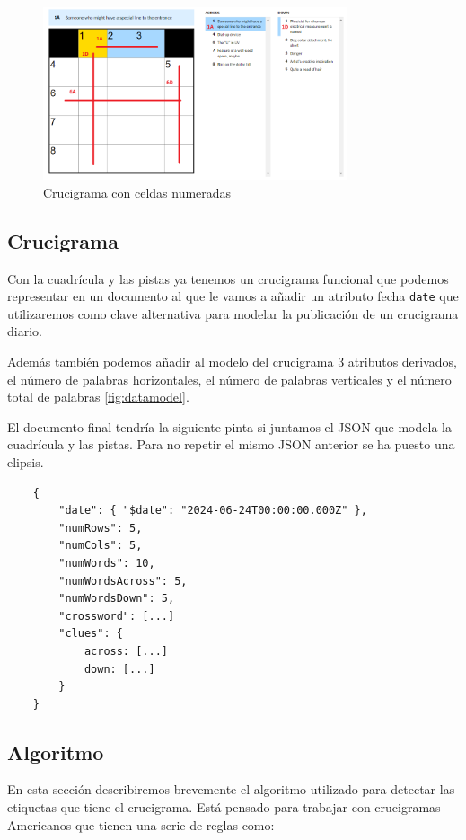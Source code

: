 \documentclass[12pt, a4paper]{article}
\begin{document}
\begin{figure}[p]
	\centering
	\includegraphics[width=0.8\textwidth]{img/new-york-times-xword.png}
	\caption{Crucigrama con celdas numeradas}
	\label{fig:xwordNYT}
\end{figure}

\subsection{Crucigrama}

Con la cuadrícula y las pistas ya tenemos un crucigrama funcional que podemos
representar en un documento al que le vamos a añadir un atributo fecha
\verb*|date| que utilizaremos como clave alternativa para modelar la publicación
de un crucigrama diario. 

Además también podemos añadir al modelo del crucigrama 3 atributos derivados, el número de
palabras horizontales, el número de palabras verticales y el número total de 
palabras \ref{fig:datamodel}.

El documento final tendría la siguiente pinta si juntamos el JSON que modela
la cuadrícula y las pistas. Para no repetir el mismo JSON anterior se ha puesto
una elipsis.

\begin{verbatim}
	{
		"date": { "$date": "2024-06-24T00:00:00.000Z" },
		"numRows": 5,
		"numCols": 5,
		"numWords": 10,
		"numWordsAcross": 5,
		"numWordsDown": 5,
		"crossword": [...]
		"clues": {
			across: [...]
			down: [...]
		}
	}
\end{verbatim}

\subsection{Algoritmo} \label{sec:algo}

En esta sección describiremos brevemente el algoritmo utilizado para detectar
las etiquetas que tiene el crucigrama. Está pensado para trabajar
con crucigramas Americanos \cite{XwordRules} que tienen una serie de reglas
como:
\end{document}
